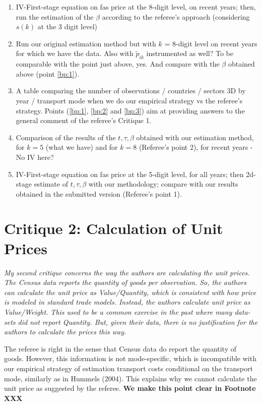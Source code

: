 \documentclass[a4paper,12pt]{article}
\begin{document}
\begin{enumerate}
\item\label{bp:1} IV-First-stage equation on fas price at the 8-digit level, on recent years; then, run the estimation of the $\beta$ according to the referee's approach (considering $s(k)$ at the 3 digit level)
\item\label{bp:2} Run our original estimation method but with $k$ = 8-digit level on recent years for which we have the data. Also with $\widetilde{p}_{ik}$ instrumented as well? To be comparable with the point just above, yes. And compare with the $\beta$ obtained above (point \ref{bp:1}).
\item\label{bp:3} A table comparing the number of observations / countries / sectors 3D by year / transport mode when we do our empirical strategy vs the referee's strategy. Points (\ref{bp:1}, \ref{bp:2} and \ref{bp:3}) aim at providing answers to the general comment of the referee's Critique 1.
\item\label{bp:4} Comparison of the results of the $t,\tau,\beta$ obtained with our estimation method, for $k=5$ (what we have) and for $k=8$ (Referee's point 2), for recent years - No IV here?
\item\label{bp:5}IV-First-stage equation on fas price at the 5-digit level, for all years; then 2d-stage estimate of $t,\tau, \beta$ with our methodology; compare with our results obtained in the submitted version (Referee's point 1).
\end{enumerate}

\section{Critique 2: Calculation of Unit Prices}

\textit{My second critique concerns the way the authors are calculating the unit prices.
The Census data reports the quantity of goods per observation. So, the authors
can calculate the unit price as Value/Quantity, which is consistent with how
price is modeled in standard trade models. Instead, the authors calculate unit
price as Value/Weight. This used to be a common exercise in the past where
many data-sets did not report Quantity. But, given their data, there is no
justification for the authors to calculate the prices this way.}

The referee is right in the sense that Census data do report the quantity of goods. However, this information is not mode-specific, which is incompatible with our empirical strategy of estimation transport costs conditional on the transport mode, similarly as in Hummels (2004). This explains why we cannot calculate the unit price as suggested by the referee. \textbf{We make this point clear in Footnote XXX}
\end{document}
